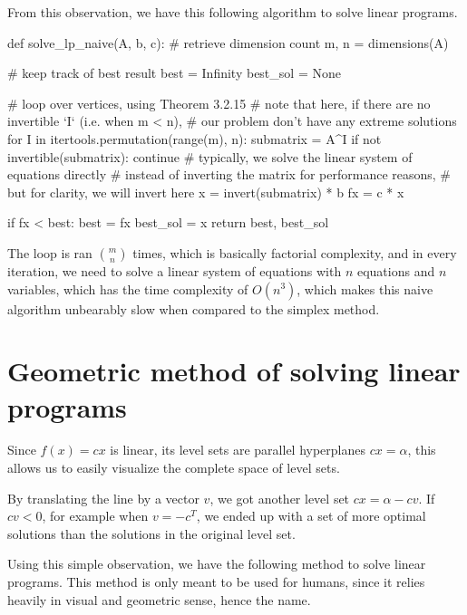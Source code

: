 From this observation, we have this following algorithm to solve linear
programs.

\begin{python}
def solve_lp_naive(A, b, c):
  # retrieve dimension count
  m, n = dimensions(A)

  # keep track of best result
  best = Infinity
  best_sol = None

  # loop over vertices, using Theorem 3.2.15
  # note that here, if there are no invertible `I` (i.e. when m < n),
  # our problem don't have any extreme solutions
  for I in itertools.permutation(range(m), n):
    submatrix = A^I
    if not invertible(submatrix):
      continue
    # typically, we solve the linear system of equations directly
    # instead of inverting the matrix for performance reasons,
    # but for clarity, we will invert here
    x = invert(submatrix) * b
    fx = c * x

    if fx < best:
      best = fx
      best_sol = x
  return best, best_sol
\end{python}

The loop is ran \(\binom{m}{n}\) times, which is basically factorial
complexity, and in every iteration, we need to solve a linear system of
equations with \( n \) equations and \( n \) variables, which has the time
complexity of \( O(n^3 ) \), which makes this naive algorithm
unbearably slow when compared to the simplex method.


\section{Geometric method of solving linear programs} %
\label{sec:Geometric method of solving linear programs}

Since \( f(x) = cx \) is linear, its level sets are parallel hyperplanes \( cx =
\alpha \), this allows us to easily visualize the complete space of level sets.

By translating the line by a vector \( v \), we got another level set \( cx =
\alpha - cv \). If \( cv < 0 \), for example when \( v = -c^{T} \), we ended up
with a set of more optimal solutions than the solutions in the original level
set.

Using this simple observation, we have the following method to solve linear
programs. This method is only meant to be used for humans, since it relies
heavily in visual and geometric sense, hence the name.

